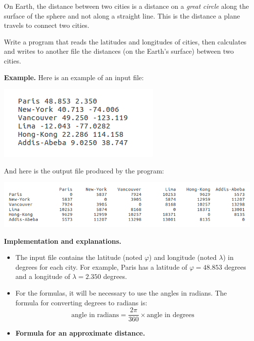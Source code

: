 \documentclass[11pt,class=report,crop=false]{standalone}
\begin{document}
\begin{activite}
\begin{enumerate}
On Earth, the distance between two cities is a distance on a \emph{great circle} along the surface of the sphere and not along a straight line. This is the distance a plane travels to connect two cities.

 Write a program that reads the latitudes and longitudes of cities, then calculates and writes to another file the distances (on the Earth's surface) between two cities. 
  
\textbf{Example.} Here is an example of an input file:
\begin{center}
\includegraphics[scale=\myscale,scale=0.7]{screen-files-4c}
\end{center}   

And here is the output file produced by the program:
\begin{center}
\includegraphics[scale=\myscale,scale=0.55]{screen-files-4d} 
\end{center}  
    
    
\textbf{Implementation and explanations.}

\begin{itemize}
	\item The input file contains the latitude (noted $\varphi$) and longitude (noted $\lambda$) in degrees for each city. For example, Paris has a latitude of $\varphi = 48.853$ degrees and a longitude of $\lambda = 2.350$ degrees.
	
	\item For the formulas, it will be necessary to use the angles in radians. The formula for converting degrees to radians is: 
	$$\text{angle in radians} = \frac{2\pi}{360} \times \text{angle in degrees}$$
		
	\item \textbf{Formula for an approximate distance.}
	

\end{itemize}
\end{enumerate}
\end{activite}
\end{document}
